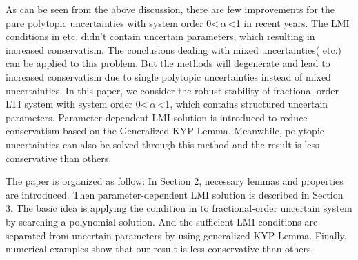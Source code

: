 \documentclass[]{interact}
\theoremstyle{plain}%
\theoremstyle{definition}
\theoremstyle{remark}
\begin{document}

\par As can be seen from the above discussion, there are few improvements for the pure polytopic uncertainties with system order 0\textless\,$\alpha$\,\textless1 in recent years. The LMI conditions in \cite{Far2011, Chen2015} etc. didn't contain uncertain parameters, which resulting in increased conservatism. The conclusions dealing with mixed uncertainties(\citealp{Abo2017, Xie2017} etc.) can be applied to this problem. But the methods will degenerate and lead to increased conservatism due to single polytopic uncertainties instead of mixed uncertainties. In this paper, we consider the robust stability of fractional-order LTI system with system order 0\textless\,$\alpha$\,\textless1, which contains structured uncertain parameters. Parameter-dependent LMI solution is introduced to reduce conservatism based on the Generalized KYP Lemma. Meanwhile, polytopic uncertainties can also be solved through this method and the result is less conservative than others. 
\par The paper is organized as follow: In Section 2, necessary lemmas and properties are introduced. Then parameter-dependent LMI solution is described in Section 3. The basic idea is applying the condition in \cite{Far2010} to fractional-order uncertain system by searching a polynomial solution. And the sufficient LMI conditions are separated from uncertain parameters by using generalized KYP Lemma. Finally, numerical examples show that our result is less conservative than others.
\end{document}
